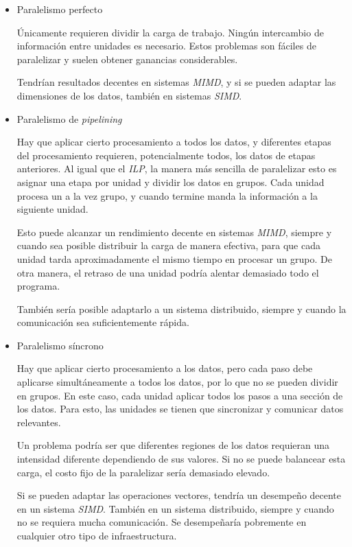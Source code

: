 \begin{itemize}
\item Paralelismo perfecto

  Únicamente requieren dividir la carga de trabajo. Ningún intercambio de
  información entre unidades es necesario. Estos problemas son fáciles de
  paralelizar y suelen obtener ganancias considerables.

  Tendrían resultados decentes en sistemas \emph{MIMD}, y si se pueden adaptar
  las dimensiones de los datos, también en sistemas \emph{SIMD}.

\item Paralelismo de \emph{pipelining}

  Hay que aplicar cierto procesamiento a todos los datos, y diferentes etapas
  del procesamiento requieren, potencialmente todos, los datos de etapas
  anteriores. Al igual que el \emph{ILP}, la manera más sencilla de paralelizar
  esto es asignar una etapa por unidad y dividir los datos en grupos. Cada
  unidad procesa un a la vez grupo, y cuando termine manda la información a la
  siguiente unidad.

  Esto puede alcanzar un rendimiento decente en sistemas \emph{MIMD}, siempre y
  cuando sea posible distribuir la carga de manera efectiva, para que cada
  unidad tarda aproximadamente el mismo tiempo en procesar un grupo. De otra
  manera, el retraso de una unidad podría alentar demasiado todo el programa.

  También sería posible adaptarlo a un sistema distribuido, siempre y cuando la
  comunicación sea suficientemente rápida.

\item Paralelismo síncrono

  Hay que aplicar cierto procesamiento a los datos, pero cada paso debe
  aplicarse simultáneamente a todos los datos, por lo que no se pueden dividir
  en grupos. En este caso, cada unidad aplicar todos los pasos a una sección
  de los datos. Para esto, las unidades se tienen que sincronizar y comunicar
  datos relevantes.

  Un problema podría ser que diferentes regiones de los datos requieran una
  intensidad diferente dependiendo de sus valores. Si no se puede balancear
  esta carga, el costo fijo de la paralelizar sería demasiado elevado.

  Si se pueden adaptar las operaciones vectores, tendría un desempeño decente
  en un sistema \emph{SIMD}. También en un sistema distribuido, siempre y
  cuando no se requiera mucha comunicación. Se desempeñaría pobremente en
  cualquier otro tipo de infraestructura.


\end{itemize}
